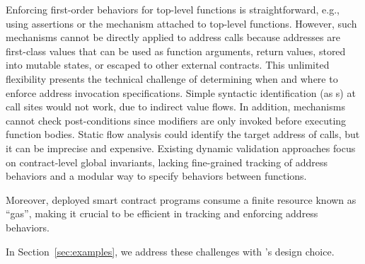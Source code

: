 Enforcing first-order behaviors for top-level functions is straightforward, e.g., using assertions or the
 mechanism \cite{soliditymod}
attached to top-level functions. 
However, 
such mechanisms
cannot be directly applied to address calls
because addresses are first-class values that can be used as function arguments,
return values, stored into mutable states, or escaped to other external contracts.
This unlimited flexibility presents the technical challenge of determining when 
and where to enforce address invocation specifications.
Simple syntactic identification (as s) at call sites would 
not work, due to indirect value flows.
In addition,  mechanisms cannot check post-conditions since modifiers are only invoked before executing function bodies.
Static flow analysis \cite{DBLP:journals/pacmpl/SmaragdakisGLTT21} could identify 
the target address of calls, but it can be imprecise and expensive.
Existing dynamic validation approaches \cite{chen2022declarative, DBLP:conf/pldi/LiCL20}
focus on contract-level global invariants, lacking 
fine-grained tracking of address behaviors and a modular way to specify 
behaviors  between functions.

Moreover, deployed smart contract programs consume a finite resource known as ``gas'', %
making it crucial to be efficient in tracking and enforcing address behaviors.

In Section~\ref{sec:examples}, we address these challenges with \lang's design choice.

